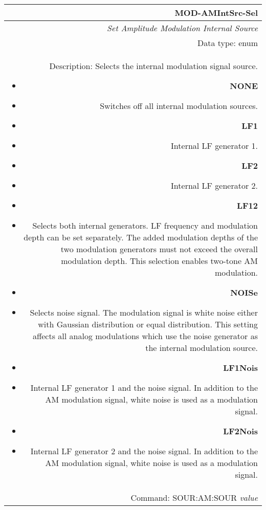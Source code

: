 \documentclass[openany]{article}
\begin{document}
		\begin{tabular}{N}
			\hline
			\bfseries MOD-AMIntSrc-Sel \\ \hline
			\emph{Set Amplitude Modulation Internal Source} \\
			Data type: enum \\  
			Description: Selects the internal modulation signal source.\begin{itemize}[noitemsep]
				\small
				\item[] \textbf{NONE}
				\item[] Switches off all internal modulation sources.
				\item[] \textbf{LF1}
				\item[]	Internal LF generator 1.
				\item[] \textbf{LF2} 
				\item[]	Internal LF generator 2.
				\item[] \textbf{LF12} 
				\item[]	Selects both internal generators. LF frequency and modulation depth can be set separately. The added modulation depths of the two modulation generators must not exceed the overall modulation depth. This selection enables two-tone AM modulation.
				\item[] \textbf{NOISe} 
				\item[]	Selects noise signal. The modulation signal is white noise either with Gaussian distribution or equal distribution. This setting affects all analog modulations which use the noise generator as the internal modulation source.
				\item[] \textbf{LF1Nois} 
				\item[]	Internal LF generator 1 and the noise signal. In addition to the AM modulation signal, white noise is used as a modulation signal.
				\item[] \textbf{LF2Nois} 
				\item[]	Internal LF generator 2 and the noise signal. In addition to the AM modulation signal, white noise is used as a modulation signal.

			\end{itemize} \\
			Command: SOUR:AM:SOUR \emph{value} \\

		\end{tabular}
\end{document}
